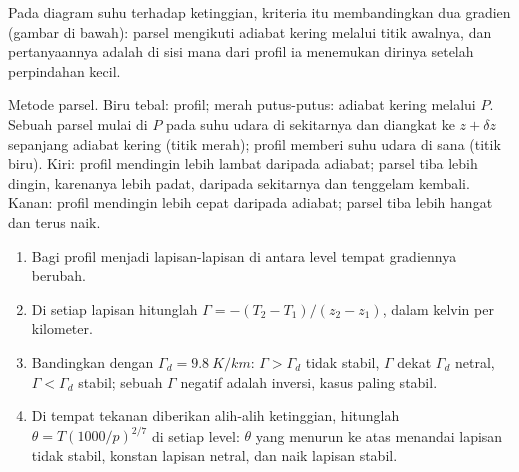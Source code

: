 Pada diagram suhu terhadap ketinggian, kriteria itu membandingkan dua gradien (gambar di bawah): parsel mengikuti adiabat kering melalui titik awalnya, dan pertanyaannya adalah di sisi mana dari profil ia menemukan dirinya setelah perpindahan kecil.

\begin{omfigure}

{\small Metode parsel. Biru tebal: profil; merah putus-putus: adiabat kering melalui $P$. Sebuah parsel mulai di $P$ pada suhu udara di sekitarnya dan diangkat ke $z + \delta z$ sepanjang adiabat kering (titik merah); profil memberi suhu udara di sana (titik biru). Kiri: profil mendingin lebih lambat daripada adiabat; parsel tiba lebih dingin, karenanya lebih padat, daripada sekitarnya dan tenggelam kembali. Kanan: profil mendingin lebih cepat daripada adiabat; parsel tiba lebih hangat dan terus naik.}
\label{fig:b1:fluid-envelopes-structure:parcel}
\end{omfigure}

\begin{method}\label{met:b1:fluid-envelopes-structure:sounding}
\begin{enumerate}
  \item Bagi profil menjadi lapisan-lapisan di antara level tempat gradiennya berubah.
  \item Di setiap lapisan hitunglah $\Gamma = -(T_2 - T_1)/(z_2 - z_1)$, dalam kelvin per kilometer.
  \item Bandingkan dengan $\Gamma_d = \qty{9.8}{K/km}$: $\Gamma > \Gamma_d$ tidak stabil, $\Gamma$ dekat $\Gamma_d$ netral, $\Gamma < \Gamma_d$ stabil; sebuah $\Gamma$ negatif adalah inversi, kasus paling stabil.
  \item Di tempat tekanan diberikan alih-alih ketinggian, hitunglah $\theta =
        T(1000/p)^{2/7}$ di setiap level: $\theta$ yang menurun ke atas menandai lapisan tidak stabil, konstan lapisan netral, dan naik lapisan stabil.
\end{enumerate}
\end{method}

